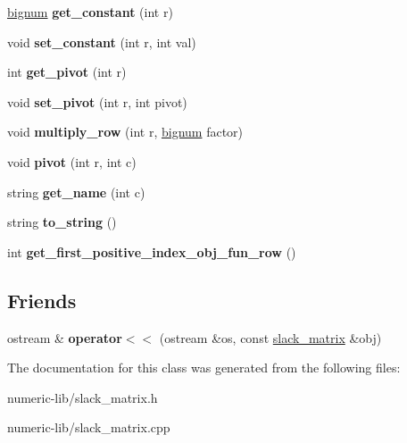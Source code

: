\begin{DoxyCompactItemize}
\item 
\hypertarget{classslack__matrix_a90305335c2cb151c1e0fb26a82270b47}{\hyperlink{classbignum}{bignum} {\bfseries get\-\_\-constant} (int r)}\label{classslack__matrix_a90305335c2cb151c1e0fb26a82270b47}

\item 
\hypertarget{classslack__matrix_a2ac027d1738305efe9fef42622de40dc}{void {\bfseries set\-\_\-constant} (int r, int val)}\label{classslack__matrix_a2ac027d1738305efe9fef42622de40dc}

\item 
\hypertarget{classslack__matrix_a8060f36bc8d3a3e5cb41cb7c1cf87742}{int {\bfseries get\-\_\-pivot} (int r)}\label{classslack__matrix_a8060f36bc8d3a3e5cb41cb7c1cf87742}

\item 
\hypertarget{classslack__matrix_a1aeb85353aa2cd64439ef0e75bd1e80e}{void {\bfseries set\-\_\-pivot} (int r, int pivot)}\label{classslack__matrix_a1aeb85353aa2cd64439ef0e75bd1e80e}

\item 
\hypertarget{classslack__matrix_a6bacdc376d1b004d9f5088beb58ed73f}{void {\bfseries multiply\-\_\-row} (int r, \hyperlink{classbignum}{bignum} factor)}\label{classslack__matrix_a6bacdc376d1b004d9f5088beb58ed73f}

\item 
\hypertarget{classslack__matrix_a288968dc7502607a2d931ebf5e07bcc7}{void {\bfseries pivot} (int r, int c)}\label{classslack__matrix_a288968dc7502607a2d931ebf5e07bcc7}

\item 
\hypertarget{classslack__matrix_ae4c603fb803cb740ece057ec76731960}{string {\bfseries get\-\_\-name} (int c)}\label{classslack__matrix_ae4c603fb803cb740ece057ec76731960}

\item 
\hypertarget{classslack__matrix_a5bf4d7c41dd5385eae106d1157f2f0eb}{string {\bfseries to\-\_\-string} ()}\label{classslack__matrix_a5bf4d7c41dd5385eae106d1157f2f0eb}

\item 
\hypertarget{classslack__matrix_aaf28359823598a060253021effbd3cee}{int {\bfseries get\-\_\-first\-\_\-positive\-\_\-index\-\_\-obj\-\_\-fun\-\_\-row} ()}\label{classslack__matrix_aaf28359823598a060253021effbd3cee}

\end{DoxyCompactItemize}
\subsection*{\-Friends}
\begin{DoxyCompactItemize}
\item 
\hypertarget{classslack__matrix_ae7a4722cdf4d6bfa64488091ec9cd1c7}{ostream \& {\bfseries operator$<$$<$} (ostream \&os, const \hyperlink{classslack__matrix}{slack\-\_\-matrix} \&obj)}\label{classslack__matrix_ae7a4722cdf4d6bfa64488091ec9cd1c7}

\end{DoxyCompactItemize}


\-The documentation for this class was generated from the following files\-:\begin{DoxyCompactItemize}
\item 
numeric-\/lib/slack\-\_\-matrix.\-h\item 
numeric-\/lib/slack\-\_\-matrix.\-cpp\end{DoxyCompactItemize}

